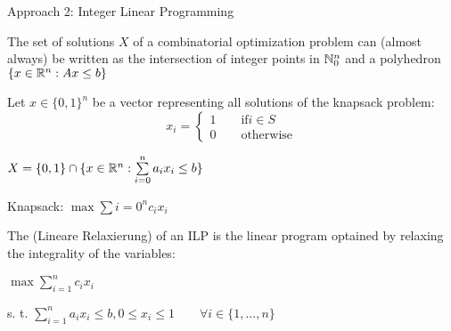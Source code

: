 Approach 2: Integer Linear Programming

The set of solutions $X$ of a combinatorial optimization problem can (almost always) be written as the intersection of integer points in $\mathbb{N}_0^n$ and a polyhedron $\{x \in \mathbb{R}^n: Ax\leq b\}$

Let $x \in \{0,1\}^n$ be a vector representing all solutions of the knapsack problem:
\[
	x_i = \begin{cases}
		1 \qquad \text{if} i \in S \\
		0 \qquad \text{otherwise}
	\end{cases}
\]

$X = \{0,1\} \cap \{ x \in \mathbb{R}^n: \sum\limits_{i = 0}^n a_ix_i\leq b\}$

Knapsack: $\max \sum{i = 0}^n c_i x_i$

The  (Lineare Relaxierung) of an ILP is the linear program optained by relaxing the integrality of the variables:

$\max \sum_{i=1}^n c_i x_i$

s. t. $\sum_{i=1}^n a_i x_i \leq b, 0 \leq x_i \leq 1 \qquad \forall i \in \{1, ..., n\}$
